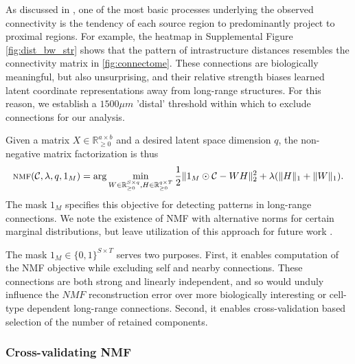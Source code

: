 As discussed in \citet{Knox2019-ot}, one of the most basic processes underlying the observed connectivity is the tendency of each source region to predominantly project to proximal regions.
For example, the heatmap in Supplemental Figure \ref{fig:dist_bw_str} shows that the pattern of intrastructure distances resembles the connectivity matrix in \ref{fig:connectome}.
These connections are biologically meaningful, but also unsurprising, and their relative strength biases learned latent coordinate representations away from long-range structures.
For this reason, we establish a $1500 \mu m$ 'distal' threshold within which to exclude connections for our analysis.


Given a matrix $X \in \mathbb R_{\geq 0}^{a \times b}$ and a desired latent space dimension $q$, the non-negative matrix factorization is thus
\begin{eqnarray*}
\textsc{nmf} (\mathcal C, \lambda, q,1_{M}) = \arg \min_{W \in \mathbb R_{\geq 0}^{S \times q}, H\in \mathbb R_{\geq 0}^{q \times T}} \frac{1}{2}\| 1_{M} \odot \mathcal C - WH\|_2^2  + \lambda  (\|H \|_1 + \|W \|_1) .
\end{eqnarray*}
The mask $1_M$ specifies this objective for detecting patterns in long-range connections.
We note the existence of NMF with alternative norms for certain marginal distributions, but leave utilization of this approach for future work \citep{Brunet2004-gi}.

The mask $1_M \in \{0,1\}^{S \times T}$ serves two purposes.
First, it enables computation of the NMF objective while excluding self and nearby connections.
These connections are both strong and linearly independent, and so would unduly influence the $NMF$ reconstruction error over more biologically interesting or cell-type dependent long-range connections.
Second, it enables cross-validation based selection of the number of retained components.

\subsubsection{Cross-validating NMF}

